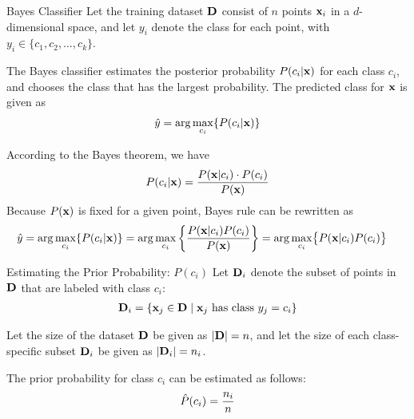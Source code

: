 
\date{Chapter 18: Probabilistic Classification}

\begin{frame}
\titlepage
\end{frame}


\begin{frame}{Bayes Classif\/{i}er}
Let the training dataset $\mathbf{D}$ consist of $n$ points $\mathbf{x}_i$ in a
$d$-dimensional space, and let $y_i$ denote the class for each
point, with $y_i \in \{c_1,c_2,\ldots,c_k\}$. 

\bigskip
The Bayes classif\/{i}er
 estimates the posterior probability
$P(c_i | \mathbf{x})$ for each class $c_i$, and chooses the class that
has the largest probability. The predicted class for $\mathbf{x}$ is
given as
\begin{align*}
    \hat{y} = \arg\max_{c_i} \{ P(c_i|\mathbf{x}) \}
\end{align*}

According to the Bayes theorem, we have
\begin{align*}
    P(c_i|\mathbf{x}) = \frac{P(\mathbf{x}|c_i) \cdot P(c_i)}{P(\mathbf{x})}
\end{align*}
Because $P(\mathbf{x})$ is f\/{i}xed for a given point, Bayes rule 
can be rewritten as
\begin{align*}
    \hat{y} & = \arg\max_{c_i} \{ P(c_i|\mathbf{x}) \} 
    = \arg\max_{c_i} \left\{ {P(\mathbf{x}|c_i)P(c_i) \over P(\mathbf{x})}
    \right\}
     = \arg\max_{c_i} \bigr\{ P(\mathbf{x}|c_i)P(c_i) \bigl\}
\end{align*}
\end{frame}



\begin{frame}{Estimating the Prior Probability: $P(c_i)$}
 Let
$\mathbf{D}_i$ denote the subset of points in $\mathbf{D}$ that are labeled with
class $c_i$:
\begin{align*}
    \mathbf{D}_i = \{\mathbf{x}_{j} \in \mathbf{D} \mid \mathbf{x}_{j} \mbox{ has
    class } y_{j}=c_i \}
\end{align*}

\bigskip
Let the size of the dataset $\mathbf{D}$ be given as $|\mathbf{D}| = n$, and let
the size of each class-specif\/{i}c subset $\mathbf{D}_i$ be given as
$|\mathbf{D}_i| = n_i$. 

\bigskip
The prior probability for class $c_i$ can be
estimated as follows:
\begin{align*}
  \hat{P}(c_i) = \frac{n_i}{n}
\end{align*}
\end{frame}



